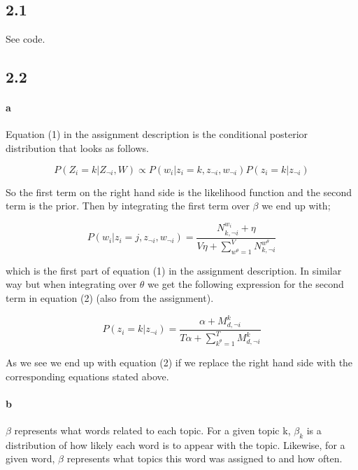 \documentclass{article}
\begin{document}
\subsection*{2.1}

See code.

\subsection*{2.2}

\paragraph{a}

Equation (1) in the assignment description is the conditional posterior
distribution that looks as follows.

\begin{equation*}
P(Z_i = k \vert Z_{\neg i}, W) \propto P(w_i \vert z_i = k, z_{\neg i}, w_{\neg i})P(z_i = k \vert z_{\neg i })
\end{equation*}

So the first term on the right hand side is the likelihood function and the
second term is the prior. Then by integrating the first term over $\beta$ we
end up with;

\begin{equation*}
P(w_i \vert z_i = j, z_{\neg i}, w_{\neg i}) = \frac{ N^{w_i}_{k,\neg i} + \eta }{V\eta + \sum_{w^{\theta}=1}^V N^{w^\theta}_{k, \neg i}}
\end{equation*}

which is the first part of equation (1) in the assignment description. In
similar way but when integrating over $\theta$ we get the following expression
for the second term in equation (2) (also from the assignment).

\begin{equation*}
P(z_i = k \vert z_{\neg i}) = \frac{\alpha + M^{k}_{d,\neg i}}{T\alpha + \sum_{k^\theta=1}^T M^k_{d, \neg i} }
\end{equation*}

As we see we end up with equation (2) if we replace the right hand side with
the corresponding equations stated above.

\paragraph{b}

$\beta$ represents what words related to each topic. For a given topic k,
$\beta_k$ is a distribution of how likely each word is to appear with the
topic. Likewise, for a given word, $\beta$ represents what topics this word was
assigned to and how often.
\end{document}
